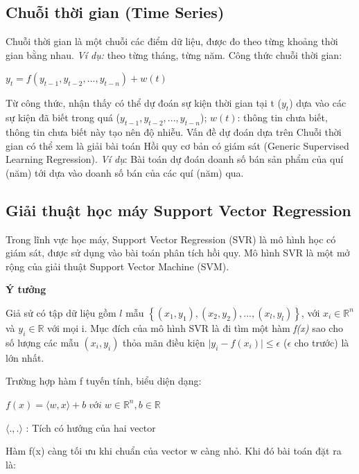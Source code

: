 \documentclass[12pt]{extarticle}
\begin{document}
		\subsection{Chuỗi thời gian (Time Series)}
			\par Chuỗi thời gian là một chuỗi các điểm dữ liệu, được đo theo từng khoảng thời gian bằng nhau. \textit{Ví dụ:} theo từng tháng, từng năm. Công thức chuỗi thời gian:
			\begin{center}
				$y_{t}=f(y_{t-1},y_{t-2},...,y_{t-n}) + w(t)$
			\end{center}
			\par Từ công thức, nhận thấy có thể dự đoán sự kiện thời gian tại t ($y_{t}$) dựa vào các sự kiện đã biết trong quá ($y_{t-1},y_{t-2},...,y_{t-n}$); $w(t)$: thông tin chưa biết, thông tin chưa biết này tạo nên độ nhiễu. Vấn đề dự đoán dựa trên Chuỗi thời gian có thể xem là giải bài toán Hồi quy cơ bản có giám sát (Generic Supervised Learning Regression). \textit{Ví dụ}: Bài toán dự đoán doanh số bán sản phẩm của quí (năm) tới dựa vào doanh số bán của các quí (năm) qua.
		\subsection{Giải thuật học máy Support Vector Regression}
			\par Trong lĩnh vực học máy, Support Vector Regression (SVR) là mô hình học có giám sát, được sử dụng vào bài toán phân tích hồi quy. Mô hình SVR là một mở rộng của giải thuật Support Vector Machine (SVM).
			\par \textbf{Ý tưởng}
				\par Giả sử có tập dữ liệu gồm $l$ mẫu $\left\{\left(x_{1},y_{1}\right),\left(x_{2},y_{2}\right),...,\left(x_{l},y_{l}\right)\right\}$, với $x_{i}\in  \mathbb{R}^{n}$ và $y_{i}\in  \mathbb{R}$ với mọi i. Mục đích của mô hình SVR là đi tìm một hàm \textit{f(x)} sao cho số lượng các mẫu $\left(x_{i},y_{i}\right)$ thỏa mãn điều kiện $\mid y_{i} - f(x_{i})\mid \leq \epsilon $ ($\epsilon$ cho trước) là lớn nhất.
				\par Trường hợp hàm f tuyến tính, biểu diện dạng:
					\begin{center}
						$f(x)=\langle w,x\rangle + b \;với \;w\in \mathbb{R}^{n}, b\in \mathbb{R}$
						\par $\langle .,.\rangle$ : Tích có hướng của hai vector
					\end{center}
				\par Hàm f(x) càng tối ưu khi chuẩn của vector w càng nhỏ. Khi đó bài toán đặt ra là:
					
\end{document}
